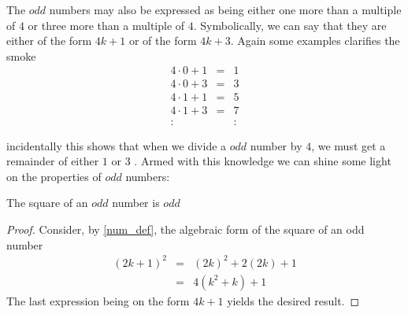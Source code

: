 The $odd$ numbers may also be expressed as being either one more than a
multiple of $4$ or three more than a multiple of $4$. Symbolically, we can say
that they are either of the form $4k + 1$ or of the form $4k  + 3$. Again some
examples clarifies the smoke
\[
\begin{array}{lcl}
4 \cdot 0 + 1 & = & 1 \\
4 \cdot 0 + 3 & = & 3 \\
4 \cdot 1 + 1 & = & 5 \\
4 \cdot 1 + 3 & = & 7 \\
:             &   & :
\end{array}
\]

incidentally this shows that when we divide a $odd$ number by $4$, we must get
a remainder of either $1$ or $3$ \label{remainder}. Armed with this knowledge
we can shine some light on the properties of $odd$ numbers:
\begin{corollary}
The square of an $odd$ number is $odd$
\end{corollary}
\begin{proof}
Consider, by \ref{num_def}, the algebraic form of the square of an odd number
\[
\begin{array}{lcl}
(2k+1)^2 & = & (2k)^2 + 2(2k) + 1 \\
                 & = & 4(k^2 + k) + 1
\end{array}
\]
The last expression being on the form $4k + 1$ yields the desired result.
\end{proof}

